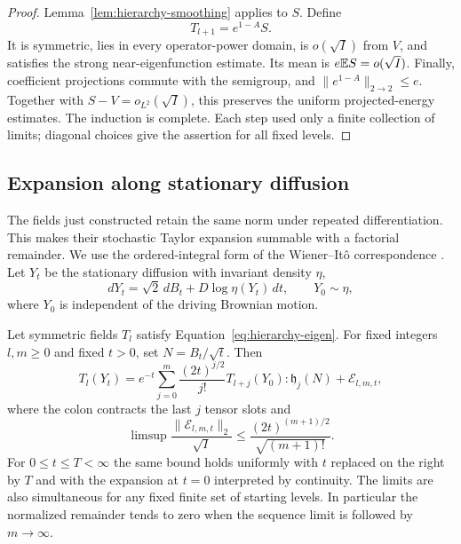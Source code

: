 \begin{proof}
Lemma~\ref{lem:hierarchy-smoothing} applies to $S$.  Define
\[
 T_{l+1}=e^{1-A}S.
\]
It is symmetric, lies in every operator-power domain, is
$o(\sqrt I)$ from $V$, and satisfies the strong near-eigenfunction
estimate.  Its mean is $e\mathbb E S=o(\sqrt I)$.  Finally, coefficient
projections commute with the semigroup, and $\|e^{1-A}\|_{2\to2}\le e$.
Together with $S-V=o_{L^2}(\sqrt I)$, this preserves the uniform
projected-energy estimates.  The induction is complete.  Each step used
only a finite collection of limits; diagonal choices give the assertion
for all fixed levels.
\end{proof}

\subsection{Expansion along stationary diffusion}

The fields just constructed retain the same norm under repeated
differentiation.  This makes their stochastic Taylor expansion summable
with a factorial remainder.  We use the ordered-integral form of the
Wiener--It\^o correspondence \cite[Section~5]{Ito1951}.  Let $Y_t$ be
the stationary diffusion with
invariant density $\eta$,
\[
 dY_t=\sqrt2\,dB_t+D\log\eta(Y_t)\,dt,\qquad Y_0\sim\eta,
\]
where $Y_0$ is independent of the driving Brownian motion.

\begin{lemma}
\label{lem:hermite-expansion}
Let symmetric fields $T_l$ satisfy Equation~\eqref{eq:hierarchy-eigen}.
For fixed integers $l,m\ge0$ and fixed $t>0$, set $N=B_t/\sqrt t$.  Then
\begin{equation}\label{eq:hierarchy-diffusion-expansion}
 T_l(Y_t)=e^{-t}\sum_{j=0}^m\frac{(2t)^{j/2}}{j!}
       T_{l+j}(Y_0):\mathfrak h_j(N)+\mathcal E_{l,m,t},
\end{equation}
where the colon contracts the last $j$ tensor slots and
\begin{equation}\label{eq:hierarchy-diffusion-remainder}
 \limsup\frac{\|\mathcal E_{l,m,t}\|_2}{\sqrt I}
 \le\frac{(2t)^{(m+1)/2}}{\sqrt{(m+1)!}}.
\end{equation}
For $0\le t\le T<\infty$ the same bound holds uniformly with $t$
replaced on the right by $T$ and with the expansion at $t=0$ interpreted
by continuity.  The limits are also simultaneous for any fixed finite
set of starting levels.  In particular the normalized remainder tends
to zero when the sequence limit is followed by $m\to\infty$.
\end{lemma}

